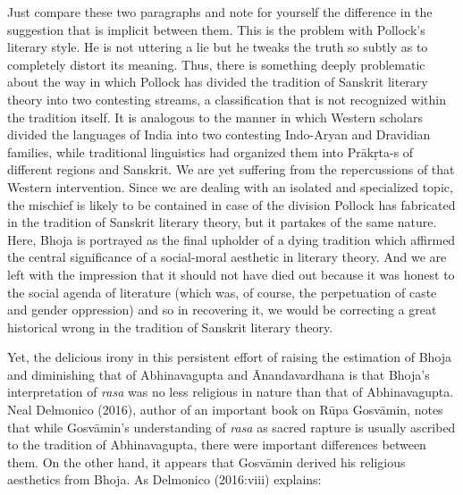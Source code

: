 Just compare these two paragraphs and note for yourself the difference in the suggestion that is implicit between them. This is the problem with Pollock's literary style. He is not uttering a lie but he tweaks the truth so subtly as to completely distort its meaning. Thus, there is something deeply problematic about the way in which Pollock has divided the tradition of Sanskrit literary theory into two contesting streams, a classification that is not recognized within the tradition itself. It is analogous to the manner in which Western scholars divided the languages of India into two contesting Indo-Aryan and Dravidian families, while traditional linguistics had organized them into Prākṛta-s of different regions and Sanskrit. We are yet suffering from the repercussions of that Western intervention. Since we are dealing with an isolated and specialized topic, the mischief is likely to be contained in case of the division Pollock has fabricated in the tradition of Sanskrit literary theory, but it partakes of the same nature. Here, Bhoja is portrayed as the final upholder of a dying tradition which affirmed the central significance of a social-moral aesthetic in literary theory. And we are left with the impression that it should not have died out because it was honest to the social agenda of literature (which was, of course, the perpetuation of caste and gender oppression) and so in recovering it, we would be correcting a great historical wrong in the tradition of Sanskrit literary theory.

Yet, the delicious irony in this persistent effort of raising the estimation of Bhoja and diminishing that of Abhinavagupta and Ānandavardhana is that Bhoja's interpretation of \textsl{rasa} was no less religious in nature than that of Abhinavagupta. Neal Delmonico (2016), author of an important book on Rūpa Gosvāmin, notes that while Gosvāmin's understanding of \textsl{rasa} as sacred rapture is usually ascribed to the tradition of Abhinavagupta, there were important differences between them. On the other hand, it appears that Gosvāmin derived his religious aesthetics from Bhoja. As Delmonico (2016:viii) explains:

